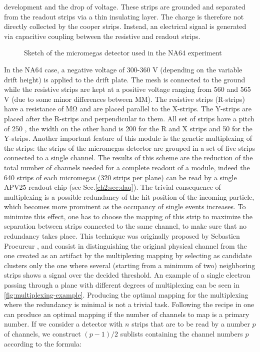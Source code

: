 development and the drop of voltage. These strips are grounded and separated from the readout strips via a thin insulating layer. The charge is therefore not directly collected by the cooper strips. Instead, an electrical signal is generated via capacitive coupling between the resistive and readout strips.

\begin{figure}[bth!]
\centering
\caption[Micromegas sketch]{Sketch of the micromegas detector used in the NA64 experiment}
\label{fig:mm-sketch}
\end{figure}

In the NA64 case, a negative voltage of 300-360 \si{\volt} (depending on the variable drift height) is applied to the drift plate. The mesh is connected to the ground while the resistive strips are kept at a positive voltage ranging from 560 and 565 \si{\volt} (due to some minor differences between MM). The resistive strips (R-strips) have a resistance of \si{\mega\ohm} and are placed parallel to the X-strips. The Y-strips are placed after the R-strips and perpendicular to them. All set of strips have a pitch of 250 \mum, the width on the other hand is 200 \mum for the R and X strips and 50 \mum for the Y-strips.
Another important feature of this module is the genetic multiplexing of the strips: the strips of the micromegas detector are grouped in a set of five strips connected to a single channel. The results of this scheme are the reduction of the total number of channels needed for a complete readout of a module, indeed the 640 strips of each micromegas (320 strips per plane) can be read by a single APV25 readout chip (see Sec.\ref{ch2:sec:daq}). The trivial consequence of multiplexing is a possible redundancy of the hit position of the incoming particle, which becomes more prominent as the occupancy of single events increases. To minimize this effect, one has to choose the mapping of this strip to maximize the separation between strips connected to the same channel, to make sure that no redundancy takes place. This technique was originally proposed by Sebastien Procureur \cite{Procureur:2013yea}, and consist in distinguishing the original physical channel from the one created as an artifact by the multiplexing mapping by selecting as candidate clusters only the one where several (starting from a minimum of two) neighboring strips shows a signal over the decided threshold. An example of a single electron passing through a plane with different degrees of multiplexing can be seen in \ref{fig:multiplexing-example}. Producing the optimal mapping for the multiplexing where the redundancy is minimal is not a trivial task. Following the recipe in \cite{Procureur:2013yea} one can produce an optimal mapping if the number of channels to map is a primary number. If we consider a detector with $n$ strips that are to be read by a number $p$ of channels, we construct $(p-1)/2$ sublists containing the channel numbers $p$ according to the formula:

